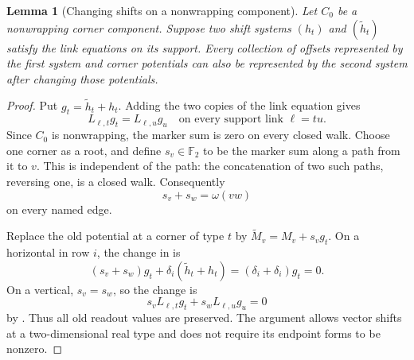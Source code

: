 \documentclass[11pt]{article}
\newtheorem{lemma}[theorem]{Lemma}
\theoremstyle{definition}
\newcommand{\F}{\mathbb F_2}
\begin{document}
\begin{lemma}[Changing shifts on a nonwrapping component]
\label{offset:lem-gauge}
Let \(C_0\) be a nonwrapping corner component. Suppose two shift systems
\((h_t)\) and \((\widetilde h_t)\) satisfy the link equations on its
support. Every collection of offsets represented by the first system
and corner potentials can also be represented by the second system
after changing those potentials.
\end{lemma}

\begin{proof}
Put \(g_t=\widetilde h_t+h_t\). Adding the two copies of the link
equation gives
\begin{equation}
   L_{\ell,t}g_t=L_{\ell,u}g_u
   \quad\text{on every support link }\ell=tu.
   \label{offset:eq-shift-difference}
\end{equation}
Since \(C_0\) is nonwrapping, the marker sum is zero on every closed walk.
Choose one corner as a root, and define \(s_v\in\F\) to be the marker sum
along a path from it to \(v\). This is independent of the path: the
concatenation of two such paths, reversing one, is a closed walk.
Consequently
\[
     s_v+s_w=\omega(vw)
\]
on every named edge.

Replace the old potential at a corner of type \(t\) by
\(\widetilde M_v=M_v+s_vg_t\). On a horizontal in row \(i\), the change
in  is
\[
 (s_v+s_w)g_t+\delta_i(\widetilde h_t+h_t)
       =(\delta_i+\delta_i)g_t=0.
\]
On a vertical, \(s_v=s_w\), so the change is
\[
 s_vL_{\ell,t}g_t+s_wL_{\ell,u}g_u=0
\]
by . Thus all old readout values are
preserved. The argument allows vector shifts at a two-dimensional
real type and does not require its endpoint forms to be nonzero.
\end{proof}
\end{document}
